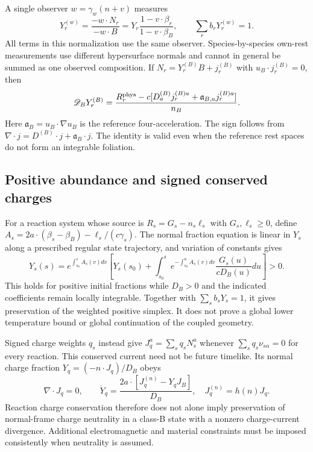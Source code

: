A single observer $w=\gamma_w(n+v)$ measures
\begin{equation}
 Y_r^{(w)}=\frac{-w\cdot N_r}{-w\cdot B}
       =Y_r\frac{1-v\cdot\beta_r}{1-v\cdot\beta_B},
 \qquad \sum_rb_rY_r^{(w)}=1.
 \label{ii:observer_abundance}
\end{equation}
All terms in this normalization use the same observer. Species-by-species own-rest measurements use different hypersurface normals and cannot in general be summed as one observed composition. If $N_r=Y_r^{(B)}B+j_r^{(B)}$ with $u_B\cdot j_r^{(B)}=0$, then
\begin{equation}
 \mathscr D_BY_r^{(B)}
  =\frac{R_r^{\rm phys}-c[D_a^{(B)}j_r^{(B)a}
                     +\mathfrak a_{B,a}j_r^{(B)a}]}{n_B}.
 \label{ii:reference_diffusion}
\end{equation}
Here $\mathfrak a_B=u_B\cdot\nabla u_B$ is the reference four-acceleration. The sign follows from
$\nabla\cdot j=D^{(B)}\cdot j+\mathfrak a_B\cdot j$. The identity is valid even when the reference rest spaces do not form an integrable foliation.


\subsection{Positive abundance and signed conserved charges}
For a reaction system whose source is $R_s=G_s-n_s\ell_s$ with $G_s,\ell_s\ge0$, define
$A_s=2a\cdot(\beta_s-\beta_B)-\ell_s/(c\gamma_s)$. The normal fraction equation is linear in $Y_s$ along a prescribed regular state trajectory, and variation of constants gives
\begin{equation}
 Y_s(s)=e^{\int_{s_0}^sA_s(v)dv}\left[Y_s(s_0)+
 \int_{s_0}^s e^{-\int_{s_0}^uA_s(v)dv}\frac{G_s(u)}{cD_B(u)}du\right]>0.
 \label{ii:abundance_positivity}
\end{equation}
This holds for positive initial fractions while $D_B>0$ and the indicated coefficients remain locally integrable. Together with $\sum_sb_sY_s=1$, it gives preservation of the weighted positive simplex. It does not prove a global lower temperature bound or global continuation of the coupled geometry.

Signed charge weights $q_s$ instead give $J_q^a=\sum_sq_sN_s^a$ whenever $\sum_sq_s\nu_{s\alpha}=0$ for every reaction. This conserved current need not be future timelike. Its normal charge fraction $Y_q=(-n\cdot J_q)/D_B$ obeys
\begin{equation}
 \nabla\cdot J_q=0,\qquad
 \dot Y_q=\frac{2a\cdot[J_q^{(n)}-Y_qJ_B]}{D_B},\quad J_q^{(n)}=h(n)J_q.
 \label{ii:charge_fraction}
\end{equation}
Reaction charge conservation therefore does not alone imply preservation of normal-frame charge neutrality in a class-B state with a nonzero charge-current divergence. Additional electromagnetic and material constraints must be imposed consistently when neutrality is assumed.

